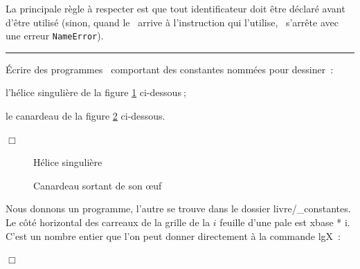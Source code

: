 La principale règle à respecter est que tout identificateur doit être déclaré avant d'être
utilisé (sinon, quand le \robot\ arrive à l'instruction qui l'utilise, \python\ s'arrête avec
une erreur {\tt NameError}).

\noindent \rule{137mm}{0.1mm} %
\begin{exercice}{Écrire des programmes \python\ comportant des constantes nom\-mées
pour dessiner~:

\tiret l'hélice singulière de la figure \ref{fig:hesing} ci-dessous$\:$;

\tiret le canardeau de la figure \ref{fig:canar} ci-dessous.

\noindent $\Box$}\end{exercice}
\begin{figure}[htbp]
 \caption{Hélice singulière}
 \label{fig:hesing}
\end{figure}
\begin{figure}[htbp]
 \caption{Canardeau sortant de son œuf}
 \label{fig:canar}
\end{figure}
\begin{corrige}{
Nous donnons un programme, l'autre se trouve dans le dossier {\idt livre/\_constantes}.
Le côté horizontal des carreaux de la grille de la $i$
feuille d'une pale est {\idt xbase * i}. C'est un nombre entier que l'on peut donner
directement à la commande {\idt lgX}~:

\noindent $\Box$}\end{corrige}
\nopagebreak


